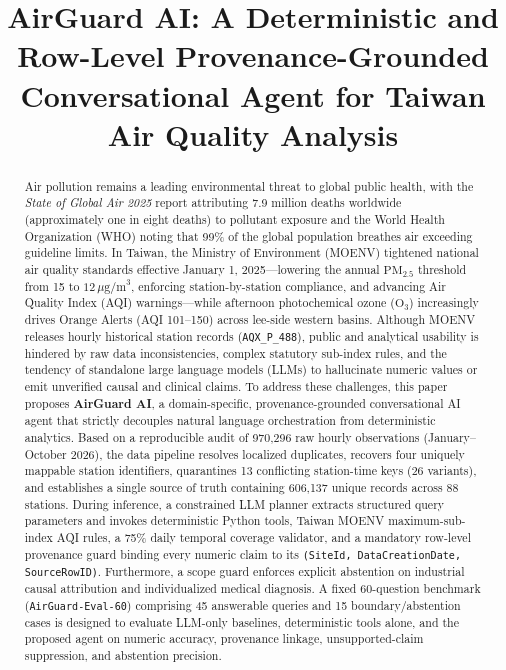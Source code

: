 \documentclass[conference]{IEEEtran}
\begin{document}
\title{AirGuard AI: A Deterministic and Row-Level Provenance-Grounded Conversational Agent for Taiwan Air Quality Analysis}

\author{
}

\maketitle

\begin{abstract}
Air pollution remains a leading environmental threat to global public health, with the \emph{State of Global Air 2025} report attributing 7.9 million deaths worldwide (approximately one in eight deaths) to pollutant exposure and the World Health Organization (WHO) noting that 99\% of the global population breathes air exceeding guideline limits. In Taiwan, the Ministry of Environment (MOENV) tightened national air quality standards effective January 1, 2025---lowering the annual $\text{PM}_{2.5}$ threshold from 15 to $12\,\mu\text{g/m}^3$, enforcing station-by-station compliance, and advancing Air Quality Index (AQI) warnings---while afternoon photochemical ozone ($\text{O}_3$) increasingly drives Orange Alerts (AQI 101--150) across lee-side western basins. Although MOENV releases hourly historical station records (\texttt{AQX\_P\_488}), public and analytical usability is hindered by raw data inconsistencies, complex statutory sub-index rules, and the tendency of standalone large language models (LLMs) to hallucinate numeric values or emit unverified causal and clinical claims. To address these challenges, this paper proposes \textbf{AirGuard AI}, a domain-specific, provenance-grounded conversational AI agent that strictly decouples natural language orchestration from deterministic analytics. Based on a reproducible audit of 970,296 raw hourly observations (January--October 2026), the data pipeline resolves localized duplicates, recovers four uniquely mappable station identifiers, quarantines 13 conflicting station-time keys (26 variants), and establishes a single source of truth containing 606,137 unique records across 88 stations. During inference, a constrained LLM planner extracts structured query parameters and invokes deterministic Python tools, Taiwan MOENV maximum-sub-index AQI rules, a 75\% daily temporal coverage validator, and a mandatory row-level provenance guard binding every numeric claim to its \texttt{(SiteId, DataCreationDate, SourceRowID)}. Furthermore, a scope guard enforces explicit abstention on industrial causal attribution and individualized medical diagnosis. A fixed 60-question benchmark (\texttt{AirGuard-Eval-60}) comprising 45 answerable queries and 15 boundary/abstention cases is designed to evaluate LLM-only baselines, deterministic tools alone, and the proposed agent on numeric accuracy, provenance linkage, unsupported-claim suppression, and abstention precision.
\end{abstract}
\end{document}
